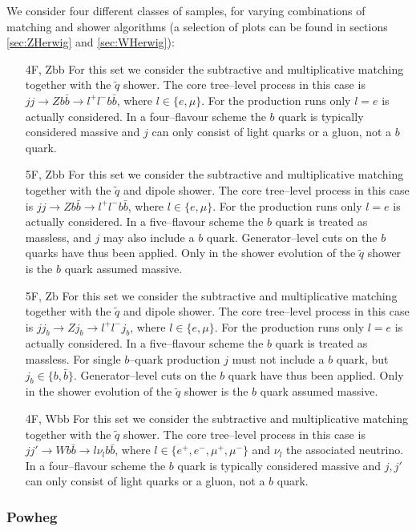 \documentclass[11pt]{cernrep} \usepackage{graphicx,epsfig} 
\begin{document}
We consider four different classes of samples, for varying combinations of matching and shower algorithms
(a selection of plots can be found in sections \ref{sec:ZHerwig} and \ref{sec:WHerwig}):
\begin{itemize}
\item[4F, Zbb] For this set we consider the subtractive and multiplicative matching
together with the $\tilde{q}$ shower.
The core tree--level process in this case is $jj \to Z b\bar{b} \to l^+ l^- b\bar{b}$,
where $l \in \{e, \mu\}$. For the production runs only $l=e$ is actually considered.
In a four--flavour scheme the $b$ quark is typically considered massive
and $j$ can only consist of light quarks or a gluon, not a $b$ quark.
\item[5F, Zbb] For this set we consider the subtractive and multiplicative matching
together with the $\tilde{q}$ and dipole shower.
The core tree--level process in this case is $jj \to Z b\bar{b} \to l^+ l^- b\bar{b}$,
where $l \in \{e, \mu\}$. For the production runs only $l=e$ is actually considered.
In a five--flavour scheme the $b$ quark is treated as massless,
and $j$ may also include a $b$ quark.
Generator--level cuts on the $b$ quarks have thus been applied.
Only in the shower evolution of the $\tilde{q}$ shower is the $b$ quark assumed massive.
\item[5F, Zb] For this set we consider the subtractive and multiplicative matching
together with the $\tilde{q}$ and dipole shower.
The core tree--level process in this case is $jj_b \to Z j_b \to l^+ l^- j_b$,
where $l \in \{e, \mu\}$. For the production runs only $l=e$ is actually considered.
In a five--flavour scheme the $b$ quark is treated as massless.
For single $b$--quark production $j$ must not include a $b$ quark, but $j_b \in \{b,\bar{b}\}$.
Generator--level cuts on the $b$ quark have thus been applied.
Only in the shower evolution of the $\tilde{q}$ shower is the $b$ quark assumed massive.
\item[4F, Wbb] For this set we consider the subtractive and multiplicative matching
together with the $\tilde{q}$ shower.
The core tree--level process in this case is $jj' \to W b\bar{b} \to l \nu_l b\bar{b}$,
where $l \in \{e^+, e^-, \mu^+, \mu^-\}$ and $\nu_l$ the associated neutrino.
In a four--flavour scheme the $b$ quark is typically considered massive
and $j,j'$ can only consist of light quarks or a gluon, not a $b$ quark.
\end{itemize}

\subsubsection{Powheg }
\end{document}
